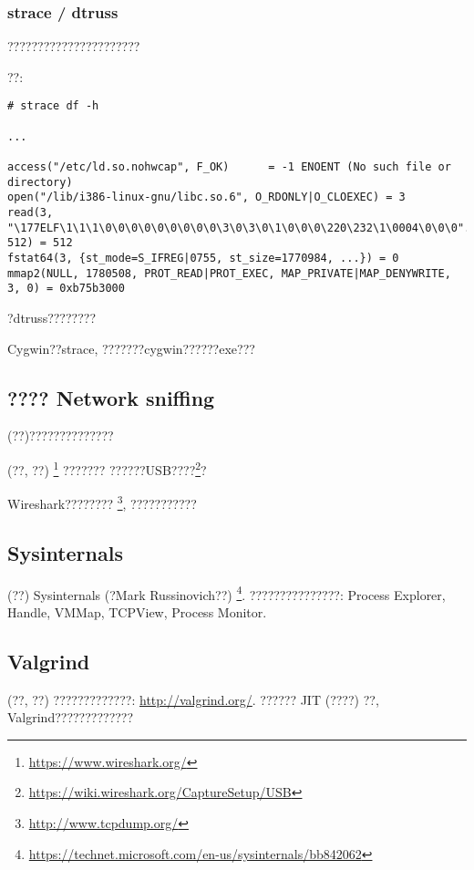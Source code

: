 \label{strace}
\subsubsection{strace / dtruss}

??????????????????????

??:

\begin{lstlisting}
# strace df -h

...

access("/etc/ld.so.nohwcap", F_OK)      = -1 ENOENT (No such file or directory)
open("/lib/i386-linux-gnu/libc.so.6", O_RDONLY|O_CLOEXEC) = 3
read(3, "\177ELF\1\1\1\0\0\0\0\0\0\0\0\0\3\0\3\0\1\0\0\0\220\232\1\0004\0\0\0"..., 512) = 512
fstat64(3, {st_mode=S_IFREG|0755, st_size=1770984, ...}) = 0
mmap2(NULL, 1780508, PROT_READ|PROT_EXEC, MAP_PRIVATE|MAP_DENYWRITE, 3, 0) = 0xb75b3000
\end{lstlisting}

\myindex{\MacOSX}
\MacOSX ?dtruss????????

Cygwin??strace, ???????cygwin??????exe???

\subsection{???? Network sniffing}

 (??)??????????????

(??, ??) \footnote{\url{https://www.wireshark.org/}} ???????
??????USB????\footnote{\url{https://wiki.wireshark.org/CaptureSetup/USB}}?

Wireshark???????? \footnote{\url{http://www.tcpdump.org/}}, ???????????

\subsection{Sysinternals}

(??) Sysinternals (?Mark Russinovich??)
\footnote{\url{https://technet.microsoft.com/en-us/sysinternals/bb842062}}.
???????????????: Process Explorer, Handle, VMMap, TCPView, Process Monitor.

\subsection{Valgrind}

(??, ??) ?????????????: \url{http://valgrind.org/}.
?????? \ac{JIT} (????) ??, Valgrind?????????????

